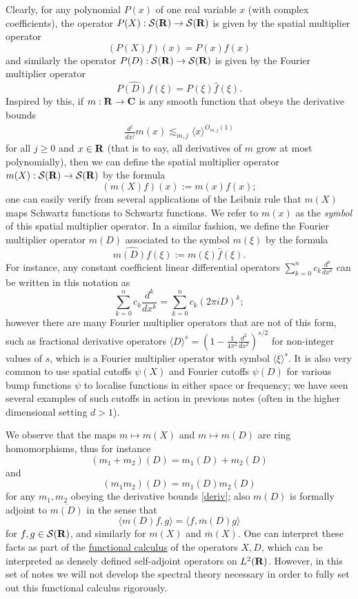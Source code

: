 \documentclass[11pt]{article}
\theoremstyle{definition}
\theoremstyle{remark}
\begin{document}
Clearly, for any polynomial \({P(x)}\) of one real variable \({x}\) (with complex coefficients), the operator \({P(X): {\mathcal S}({\bf R}) \rightarrow {\mathcal S}({\bf R})}\) is given by the spatial multiplier operator 
\[\displaystyle  (P(X) f)(x) = P(x) f(x)\]
 and similarly the operator \({P(D): {\mathcal S}({\bf R}) \rightarrow {\mathcal S}({\bf R})}\) is given by the Fourier multiplier operator 
\[\displaystyle  \widehat{P(D) f}(\xi) = P(\xi) \hat f(\xi).\]
 Inspired by this, if \({m: {\bf R} \rightarrow {\bf C}}\) is any smooth function that obeys the derivative bounds 
\begin{align}\label{deriv}
  \frac{d^j}{dx^j} m(x) \lesssim_{m,j} \langle x \rangle^{O_{m,j}(1)} 
\end{align}
 for all \({j \geq 0}\) and \({x \in {\bf R}}\) (that is to say, all derivatives of \({m}\) grow at most polynomially), then we can define the spatial multiplier operator \({m(X): {\mathcal S}({\bf R}) \rightarrow {\mathcal S}({\bf R})}\) by the formula 
\[\displaystyle  (m(X) f)(x) := m(x) f(x);\]
 one can easily verify from several applications of the Leibniz rule that \({m(X)}\) maps Schwartz functions to Schwartz functions. We refer to \({m(x)}\) as the \emph{symbol} of this spatial multiplier operator. In a similar fashion, we define the Fourier multiplier operator \({m(D)}\) associated to the symbol \({m(\xi)}\) by the formula 
\[\displaystyle  \widehat{m(D) f}(\xi) := m(\xi) \hat f(\xi).\]
 For instance, any constant coefficient linear differential operators \({\sum_{k=0}^n c_k \frac{d^k}{dx^k}}\) can be written in this notation as 
\[\displaystyle \sum_{k=0}^n c_k \frac{d^k}{dx^k} =\sum_{k=0}^n c_k (2\pi i D)^k;\]
 however there are many Fourier multiplier operators that are not of this form, such as fractional derivative operators \({\langle D \rangle^s = (1- \frac{1}{4\pi^2} \frac{d^2}{dx^2})^{s/2}}\) for non-integer values of \({s}\), which is a Fourier multiplier operator with symbol \({\langle \xi \rangle^s}\). It is also very common to use spatial cutoffs \({\psi(X)}\) and Fourier cutoffs \({\psi(D)}\) for various bump functions \({\psi}\) to localise functions in either space or frequency; we have seen several examples of such cutoffs in action in previous notes (often in the higher dimensional setting \({d>1}\)).

We observe that the maps \({m \mapsto m(X)}\) and \({m \mapsto m(D)}\) are ring homomorphisms, thus for instance 
\[\displaystyle  (m_1 + m_2)(D) = m_1(D) + m_2(D)\]
 and 
\[\displaystyle  (m_1 m_2)(D) = m_1(D) m_2(D)\]
 for any \({m_1,m_2}\) obeying the derivative bounds \eqref{deriv}; also \({m(D)}\) is formally adjoint to \({\overline{m(D)}}\) in the sense that 
\[\displaystyle  \langle m(D) f, g \rangle = \langle f, \overline{m}(D) g \rangle\]
 for \({f,g \in {\mathcal S}({\bf R})}\), and similarly for \({m(X)}\) and \({\overline{m}(X)}\). One can interpret these facts as part of the \href{https://en.wikipedia.org/wiki/Functional_calculus}{functional calculus} of the operators \({X,D}\), which can be interpreted as densely defined self-adjoint operators on \({L^2({\bf R})}\). However, in this set of notes we will not develop the spectral theory necessary in order to fully set out this functional calculus rigorously.
\end{document}
